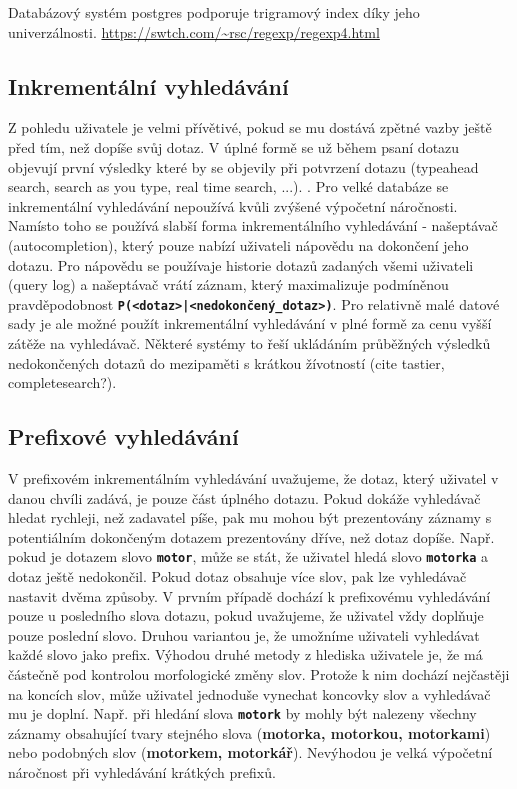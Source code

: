 \documentclass[12pt,letterpaper,oneside,openright]{book}
\newcommand{\bftt}[1]{\texttt{\textbf{#1}}}
\begin{document}

Databázový systém postgres podporuje trigramový index díky jeho univerzálnosti.
\url{https://swtch.com/~rsc/regexp/regexp4.html}


\subsection{Inkrementální vyhledávání}
Z pohledu uživatele je velmi přívětivé, pokud se mu dostává zpětné vazby ještě
před tím, než dopíše svůj dotaz. V úplné formě se už během psaní dotazu
objevují první výsledky které by se objevily při potvrzení dotazu (typeahead
search, search as you type, real time search, ...). . Pro velké databáze se
inkrementální vyhledávání nepoužívá kvůli zvýšené výpočetní náročnosti. Namísto
toho se používá slabší forma inkrementálního vyhledávání - našeptávač
(autocompletion), který pouze nabízí uživateli nápovědu na dokončení jeho
dotazu. Pro nápovědu se používaje historie dotazů zadaných všemi uživateli
(query log) a našeptávač vrátí záznam, který maximalizuje podmíněnou
pravděpodobnost \bftt{P(<dotaz>|<nedokončený\_dotaz>)}. Pro relativně malé datové
sady je ale možné použít inkrementální vyhledávání v plné formě za cenu vyšší
zátěže na vyhledávač. Některé systémy to řeší ukládáním průběžných výsledků
nedokončených dotazů do mezipaměti s krátkou žívotností (cite tastier,
completesearch?).

\subsection{Prefixové vyhledávání}
V prefixovém inkrementálním vyhledávání uvažujeme, že dotaz, který uživatel v
danou chvíli zadává, je pouze část úplného dotazu. Pokud dokáže vyhledávač
hledat rychleji, než zadavatel píše, pak mu mohou být prezentovány záznamy s
potentiálním dokončeným dotazem prezentovány dříve, než dotaz dopíše. Např.
pokud je dotazem slovo \bftt{motor}, může se stát, že uživatel hledá slovo
\bftt{motorka} a dotaz ještě nedokončil. Pokud dotaz obsahuje více slov, pak
lze vyhledávač nastavit dvěma způsoby. V prvním případě dochází k prefixovému
vyhledávání pouze u posledního slova dotazu, pokud uvažujeme, že uživatel vždy
doplňuje pouze poslední slovo. Druhou variantou je, že umožníme uživateli
vyhledávat každé slovo jako prefix. Výhodou druhé metody z hlediska uživatele
je, že má částečně pod kontrolou morfologické změny slov. Protože k nim dochází
nejčastěji na koncích slov, může uživatel jednoduše vynechat koncovky slov a
vyhledávač mu je doplní. Např. při hledání slova \bftt{motork} by mohly být
nalezeny všechny záznamy obsahující tvary stejného slova (\textbf{motorka,
motorkou, motorkami}) nebo podobných slov (\textbf{motorkem, motorkář}).
Nevýhodou je velká výpočetní náročnost při vyhledávání krátkých prefixů.
\end{document}

